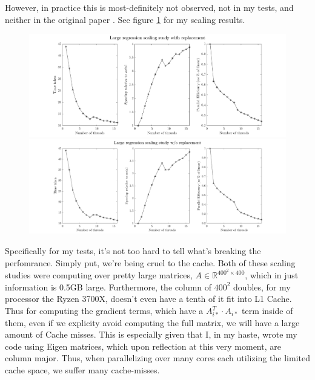However, in practice this is most-definitely not observed, not in my tests, and
neither in the original paper \cite{2011NRRW}. See figure \ref{fig:scaling} for
my scaling results.
\begin{figure}[!htb]
  \centering
  \includegraphics[width=1\textwidth]{./resources/replacement}
  \includegraphics[width=1\textwidth]{./resources/noreplacement}
  \caption{
  } \label{fig:scaling}
\end{figure}
Specifically for my tests, it's not too hard to tell what's breaking the
perfomrance. Simply put, we're being cruel to the cache. Both of these scaling
studies were computing over pretty large matrices, $A \in \mathbb{R}^{400^2
\times 400}$, which in just information is 0.5GB large. Furthermore, the column
of $400^2$ doubles, for my processor the Ryzen 3700X, doesn't even have a tenth
of it fit into L1 Cache. Thus for computing the gradient terms, which have
a $A_{i*}^T \cdot A_{i*}$ term inside of them, even if we explicity avoid
computing the full matrix, we will have a large amount of Cache misses. This is
especially given that I, in my haste, wrote my code using Eigen matrices, which
upon reflection at this very moment, are column major. Thus, when parallelizing
over many cores each utilizing the limited cache space, we suffer many
cache-misses.


